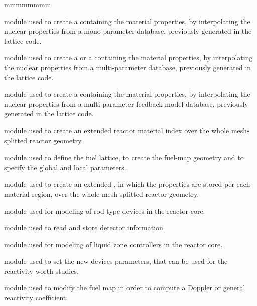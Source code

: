 \vskip 0.2cm
\begin{ListeDeDescription}{mmmmmmmm}

\item[\moc{CRE:}] module used to  create a  containing
the material properties, by interpolating the nuclear properties from a
mono-parameter database, previously generated in the lattice code.

\item[\moc{NCR:}] module used to create a  or a  containing
the material properties, by interpolating the nuclear properties from a
multi-parameter database, previously generated in the lattice code.

\item[\moc{AFM:}] module used to create a  containing
the material properties, by interpolating the nuclear properties from a
multi-parameter feedback model database, previously generated in the lattice code.

\item[\moc{USPLIT:}] module used to create an extended reactor
material index over the whole mesh-splitted reactor geometry.

\item[\moc{RESINI:}] module used to define the fuel lattice, to create
the fuel-map geometry and to specify the global and local parameters.

\item[\moc{MACINI:}] module used to create an extended ,
in which the properties are stored per each material region, over the
whole mesh-splitted reactor geometry.

\item[\moc{DEVINI:}] module used for  modeling of rod-type
devices in the reactor core.

\item[\moc{DETINI:}] module used to read and store detector information.

\item[\moc{LZC:}] module used for  modeling of liquid zone
controllers in the reactor core.

\item[\moc{DSET:}] module used to set the new devices parameters,
that can be used for the reactivity worth studies.

\item[\moc{MCC:}] module used to modify the fuel map in order to compute a Doppler
or general reactivity coefficient.


\end{ListeDeDescription}
